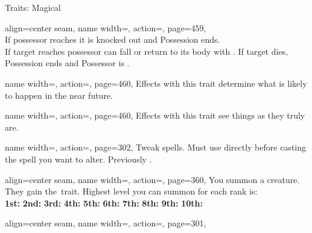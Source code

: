 \begin{PageFront}
\begin{Tables}{\frontTableHeight}
\begin{Table}{Traits: Magical}
\begin{entry}{}{%
                align=center seam,
                name width=\conditionLength,%
                action=\Possession,
                page=459,
            }
                \\
                If possessor reaches  \HPs it is knocked out and Possession ends.\\
                If target reaches  \HPs possessor can fall \Unconscious or return to its body with .\hfill
                If target dies, Possession ends and Possessor is \Stunned {}.
            \end{entry}
            \begin{entry}{}{%
                name width=\conditionLength,%
                action=\Prediction,
                page=460,
            }
                Effects with this trait determine what is likely to happen in the near future.
            \end{entry}
            \begin{entry}{}{%
                name width=\conditionLength,%
                action=\Revelation,
                page=460,
            }
                Effects with this trait see things as they truly are.
            \end{entry}
            \begin{entry}{}{%
                name width=\conditionLength,%
                action=\Spellshape,
                page=302,
            }
                Tweak spells. Must use directly before casting the spell you want to alter. \hfill
                Previously \Metamagic.
            \end{entry}
            \begin{entry}{}{%
                align=center seam,
                name width=\conditionLength,%
                action=\Summon,
                page=360,
            }
                You summon a creature.
                They gain the \Summoned\,trait.
                Highest level you can summon for each rank is:\\
                \textbf{1st:} 
                \hfill\textbf{2nd:} 
                \hfill\textbf{3rd:} 
                \hfill\textbf{4th:} 
                \hfill\textbf{5th:} 
                \hfill\textbf{6th:} 
                \hfill\textbf{7th:} 
                \hfill\textbf{8th:} 
                \hfill\textbf{9th:} 
                \hfill\textbf{10th:} 
            \end{entry}
            \begin{entry}{}{%
                align=center seam,
                name width=\conditionLength,%
                action=\Summoned,
                page=301,
            }

\end{entry}
\end{Table}
\end{Tables}
\end{PageFront}
